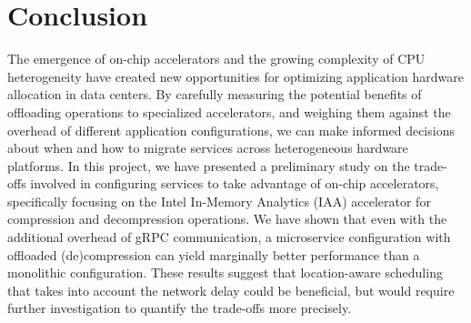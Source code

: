 \section{Conclusion}

The emergence of on-chip accelerators and the growing complexity of CPU heterogeneity have created new opportunities for optimizing application hardware allocation in data centers. 
By carefully measuring the potential benefits of offloading operations to specialized accelerators, and weighing them against the overhead of different application configurations, we can make informed decisions about when and how to migrate services across heterogeneous hardware platforms.
In this project, we have presented a preliminary study on the trade-offs involved in configuring services to take advantage of on-chip accelerators, specifically focusing on the Intel In-Memory Analytics (IAA) accelerator for compression and decompression operations.
We have shown that even with the additional overhead of gRPC communication, a microservice configuration with offloaded (de)compression can yield marginally better performance than a monolithic configuration.
These results suggest that location-aware scheduling that takes into account the network delay could be beneficial, but would require further investigation to quantify the trade-offs more precisely.
